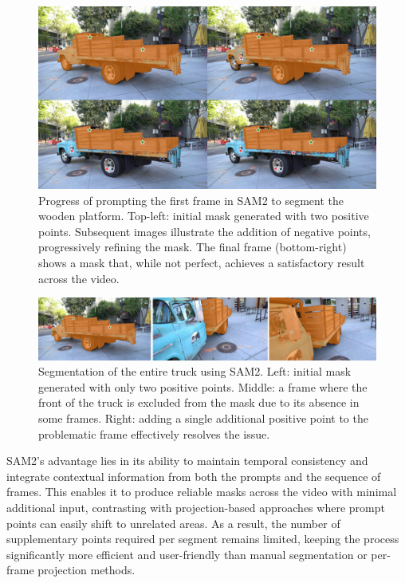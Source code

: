 \documentclass[12pt]{article}
\begin{document}
\begin{figure}[h!]
	\centering
	\includegraphics[width=\textwidth]{Images/sam2struggle.png}
	\caption{Progress of prompting the first frame in SAM2 to segment the wooden platform. Top-left: initial mask generated with two positive points. Subsequent images illustrate the addition of negative points, progressively refining the mask. The final frame (bottom-right) shows a mask that, while not perfect, achieves a satisfactory result across the video.}
	\label{fig:sam2struggle}
\end{figure}
\begin{figure}[h!]
	\centering
	\includegraphics[width=\textwidth]{Images/sam2adapt.png}
	\caption{Segmentation of the entire truck using SAM2. Left: initial mask generated with only two positive points. Middle: a frame where the front of the truck is excluded from the mask due to its absence in some frames. Right: adding a single additional positive point to the problematic frame effectively resolves the issue.}
	\label{fig:sam2adapt}
\end{figure}
\FloatBarrier
\noindent
SAM2’s advantage lies in its ability to maintain temporal consistency and integrate contextual information from both the prompts and the sequence of frames. This enables it to produce reliable masks across the video with minimal additional input, contrasting with projection-based approaches where prompt points can easily shift to unrelated areas. As a result, the number of supplementary points required per segment remains limited, keeping the process significantly more efficient and user-friendly than manual segmentation or per-frame projection methods.
\end{document}
